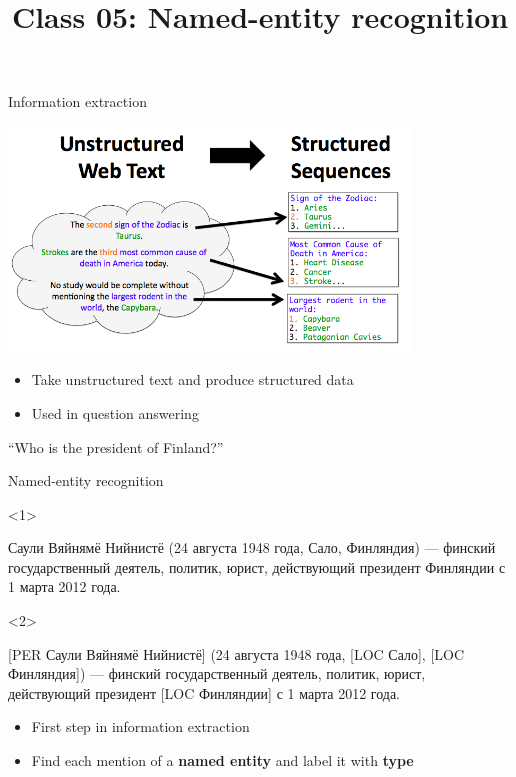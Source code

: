 \documentclass[10pt, compress]{beamer}
\title{Class 05: Named-entity recognition}
\date{}
\begin{document}
\maketitle

\begin{frame}{Information extraction}

\begin{center}
\includegraphics[width=0.8\textwidth]{graphics/inform-extract.png}
\end{center}


\begin{itemize}
  \item Take unstructured text and produce structured data
  \item Used in question answering 
\end{itemize}

\begin{center}
``Who is the president of Finland?''
\end{center}

\end{frame}


\begin{frame}{Named-entity recognition}

\begin{onlyenv}<1>
\begin{framed}
Саули Вяйнямё Нийнистё (24 августа 1948 года, Сало, Финляндия) — финский 
государственный деятель, политик, юрист, действующий президент Финляндии с 1 марта 2012 года. 
\end{framed}
\end{onlyenv}
\begin{onlyenv}<2>
\begin{framed}
\alert<2>{[PER Саули Вяйнямё Нийнистё]} (24 августа 1948 года, \alert<2>{[LOC Сало], [LOC Финляндия]}) — финский 
государственный деятель, политик, юрист, действующий президент \alert<2>{[LOC Финляндии]} с 1 марта 2012 года. 
\end{framed}
\end{onlyenv}

\begin{itemize}
  \item First step in information extraction
  \item Find each mention of a \textbf{named entity} and label it with \textbf{type}
\end{itemize}


\end{frame}
\end{document}
